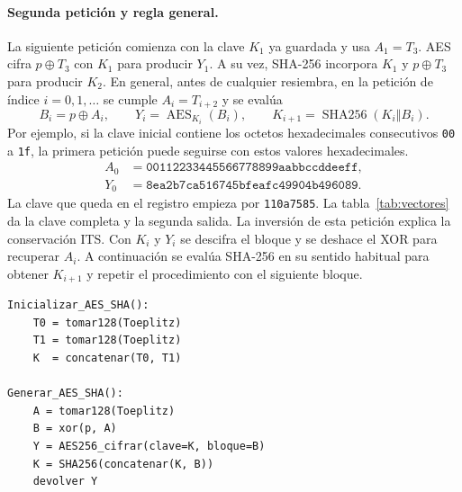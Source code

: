 \documentclass[11pt,a4paper]{article}
\newcommand{\Enc}{\operatorname{AES}}
\newcommand{\HH}{\operatorname{SHA256}}
\newcommand{\cat}{\mathbin\Vert}
\begin{document}
\paragraph{Segunda petición y regla general.}
La siguiente petición comienza con la clave \(K_1\) ya guardada y usa \(A_1=T_3\). AES cifra \(p\oplus T_3\) con \(K_1\) para producir \(Y_1\). A su vez, SHA-256 incorpora \(K_1\) y \(p\oplus T_3\) para producir \(K_2\). En general, antes de cualquier resiembra, en la petición de índice \(i=0,1,\ldots\) se cumple \(A_i=T_{i+2}\) y se evalúa
\begin{equation}
 B_i=p\oplus A_i,\qquad Y_i=\Enc_{K_i}(B_i),\qquad
 K_{i+1}=\HH(K_i\cat B_i).
 \label{eq:ais}
\end{equation}
Por ejemplo, si la clave inicial contiene los octetos hexadecimales consecutivos \texttt{00} a \texttt{1f}, la primera petición puede seguirse con estos valores hexadecimales.
\begin{align*}
 A_0&=\mathtt{00112233445566778899aabbccddeeff},\\
 Y_0&=\mathtt{8ea2b7ca516745bfeafc49904b496089}.
\end{align*}
La clave que queda en el registro empieza por \texttt{110a7585}. La tabla~\ref{tab:vectores} da la clave completa y la segunda salida. La inversión de esta petición explica la conservación ITS. Con \(K_i\) y \(Y_i\) se descifra el bloque y se deshace el XOR para recuperar \(A_i\). A continuación se evalúa SHA-256 en su sentido habitual para obtener \(K_{i+1}\) y repetir el procedimiento con el siguiente bloque.

\par\noindent\begin{minipage}{\linewidth}\small
\begin{verbatim}
Inicializar_AES_SHA():
    T0 = tomar128(Toeplitz)
    T1 = tomar128(Toeplitz)
    K  = concatenar(T0, T1)

Generar_AES_SHA():
    A = tomar128(Toeplitz)
    B = xor(p, A)
    Y = AES256_cifrar(clave=K, bloque=B)
    K = SHA256(concatenar(K, B))
    devolver Y
\end{verbatim}
\end{minipage}\par
\end{document}

